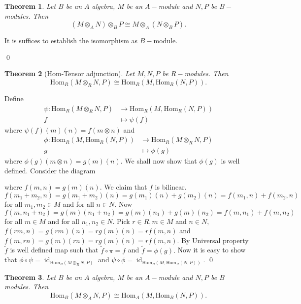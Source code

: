 \documentclass[11pt]{amsart}
\newtheorem{theorem}{Theorem}[section]
\newcommand{\Homa}[1]{\text{Hom}_A\left(#1\right)}
\newcommand{\Homb}[1]{\text{Hom}_B\left(#1\right)}
\newcommand{\Hom}[1]{\text{Hom}_R\left(#1\right)}
\DeclareMathOperator{\id}{\text{id}}
\begin{document}
\begin{theorem}
Let $B$ be an $A$ algebra, $M$ be an $A-$module and $N,P$ be $B-$modules. Then $$(M\otimes_A N)\otimes_B P\cong M\otimes_A(N\otimes_B P).$$
\end{theorem}

\proof It is suffices to establish the isomorphism as $B-$module.

\qed

\begin{theorem}[Hom-Tensor adjunction]
Let $M,N,P$ be $R-$modules. Then $$\Hom{M\otimes_RN,P}\cong \Hom{M,\Hom{N,P}}.$$
\end{theorem}

\proof Define \begin{align*}
\psi:\Hom{M\otimes_RN,P}&\to \Hom{M,\Hom{N,P}}\\
f&\mapsto \psi(f)
\end{align*}
where $\psi(f)(m)(n)=f(m\otimes n)$ and \begin{align*}
\phi:\Hom{M,\Hom{N,P}}&\to \Hom{M\otimes_RN,P}\\
g&\mapsto \phi(g)
\end{align*}
where $\phi(g)(m\otimes n)=g(m)(n).$ We shall now show that $\phi(g)$ is well defined. Consider the diagram 

\begin{center}
\end{center}

where $f(m,n)=g(m)(n)$. We claim that $f$ is bilinear. $f(m_1+m_2,n)=g(m_1+m_2)(n)=g(m_1)(n)+g(m_2)(n)=f(m_1,n)+f(m_2,n)$ for all $m_1,m_2\in M$ and for all $n\in N.$ Now $f(m,n_1+n_2)=g(m)(n_1+n_2)=g(m)(n_1)+g(m)(n_2)=f(m,n_1)+f(m,n_2)$ for all $m\in M$ and for all $n_1,n_2\in N.$ Pick $r\in R,m\in M$ and $n\in N$, $f(rm,n)=g(rm)(n)=rg(m)(n)=rf(m,n)$ and $f(m,rn)=g(m)(rn)=rg(m)(n)=rf(m,n).$ By Universal property $\tilde{f}$ is well defined map such that $\tilde{f}\circ \pi=f$ and $\tilde{f}=\phi(g).$ Now it is easy to show that $\phi\circ \psi=\id_{\Hom{M\otimes_RN,P}}$ and $\psi\circ \phi=\id_{\Hom{M,\Hom{N,P}}}.$ \qed

\begin{theorem}

Let $B$ be an $A$ algebra, $M$ be an $A-$module and $N,P$ be $B$ modules. Then $$\Homb{M\otimes_A N,P}\cong \Homa{M,\Homb{N,P}}.$$

\end{theorem}
\end{document}
